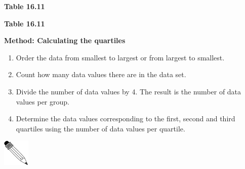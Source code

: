 \begin{description}[noitemsep]
\begin{description}[noitemsep]
\begin{table}
\begin{center}
\begin{xtabular}[t]{|c|c|c|c|c|c|c|c|c|c|c|}
    \end{xtabular}
      \end{center}
    \begin{center}{\small\bfseries Table 16.11}\end{center}
    \begin{caption}{\small\bfseries Table 16.11}\end{caption}
\end{table}
    \par
          \label{m39400*id213452}
            \textbf{Method: Calculating the quartiles}
          \par 
          \label{m39400*id213459}\begin{enumerate}[noitemsep, label=\textbf{\arabic*}. ] 
            \label{m39400*uid76}\item Order the data from smallest to largest or from largest to smallest.
\label{m39400*uid77}\item Count how many data values there are in the data set.
\label{m39400*uid78}\item Divide the number of data values by 4. The result is the number of data values per group.
\label{m39400*uid79}\item Determine the data values corresponding to the first, second and third quartiles using the number of data values per quartile.
\end{enumerate}
\par
            \label{m39400*secfhsst!!!underscore!!!id1723}\vspace{.5cm} 
      \noindent
      \hspace*{-30pt}\includegraphics[width=0.5in]{col11306.imgs/pspencil2.png}   
\end{description}
\end{description}
